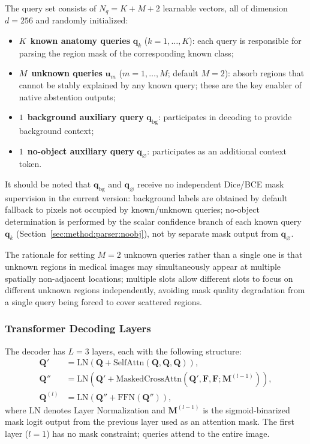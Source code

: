 \documentclass[3p,twocolumn,authoryear]{elsarticle}
\newcommand{\bF}{\mathbf{F}}                              %
\newcommand{\bq}{\mathbf{q}}                              %
\newcommand{\bu}{\mathbf{u}}                              %
\begin{document}
The query set consists of $N_q = K + M + 2$ learnable vectors, all of dimension
$d=256$ and randomly initialized:

\begin{itemize}[nosep]
  \item $K$~\textbf{known anatomy queries} $\bq_k$ ($k = 1, \ldots, K$):
        each query is responsible for parsing the region mask of the corresponding
        known class;
  \item $M$~\textbf{unknown queries} $\bu_m$ ($m = 1, \ldots, M$; default $M=2$):
        absorb regions that cannot be stably explained by any known query;
        these are the key enabler of native abstention outputs;
  \item $1$~\textbf{background auxiliary query} $\bq_{\text{bg}}$:
        participates in decoding to provide background context;
  \item $1$~\textbf{no-object auxiliary query} $\bq_{\varnothing}$:
        participates as an additional context token.
\end{itemize}

\noindent
It should be noted that $\bq_{\text{bg}}$ and $\bq_{\varnothing}$ receive no
independent Dice/BCE mask supervision in the current version:
background labels are obtained by default fallback to pixels not occupied by
known/unknown queries;
no-object determination is performed by the scalar confidence branch of each known
query $\bq_k$ (Section~\ref{sec:method:parser:noobj}), not by separate mask output
from $\bq_{\varnothing}$.

The rationale for setting $M=2$ unknown queries rather than a single one is that
unknown regions in medical images may simultaneously appear at multiple spatially
non-adjacent locations; multiple slots allow different slots to focus on different
unknown regions independently, avoiding mask quality degradation from a single query
being forced to cover scattered regions.

\subsubsection{Transformer Decoding Layers}\label{sec:method:parser:decoder}

The decoder has $L=3$ layers, each with the following structure:
\begin{align}
  \mathbf{Q}' &= \text{LN}\!\left(\mathbf{Q} + \text{SelfAttn}(\mathbf{Q}, \mathbf{Q}, \mathbf{Q})\right), \label{eq:self_attn} \\
  \mathbf{Q}'' &= \text{LN}\!\left(\mathbf{Q}' + \text{MaskedCrossAttn}(\mathbf{Q}', \bF, \bF; \mathbf{M}^{(l-1)})\right), \label{eq:cross_attn} \\
  \mathbf{Q}^{(l)} &= \text{LN}\!\left(\mathbf{Q}'' + \text{FFN}(\mathbf{Q}'')\right), \label{eq:ffn}
\end{align}
where $\text{LN}$ denotes Layer Normalization and $\mathbf{M}^{(l-1)}$ is the
sigmoid-binarized mask logit output from the previous layer used as an attention mask.
The first layer ($l=1$) has no mask constraint; queries attend to the entire image.
\end{document}
